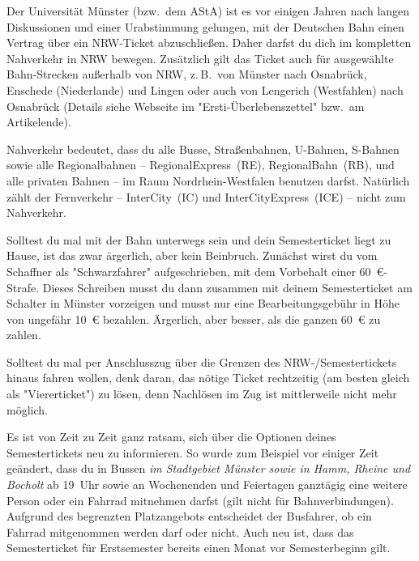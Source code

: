 \begin{multicols*}{2}
Der Universität Münster (bzw.\ dem AStA) ist es vor einigen Jahren nach langen Diskussionen und einer Urabstimmung gelungen, mit der Deutschen Bahn einen Vertrag über ein NRW-Ticket abzuschließen.
Daher darfst du dich im kompletten Nahverkehr in NRW bewegen.
Zusätzlich gilt das Ticket auch für ausgewählte Bahn-Strecken außerhalb von NRW, z.\,B.\ von Münster nach Osnabrück, Enschede (Niederlande) und Lingen oder auch von Lengerich (Westfahlen) nach Osnabrück (Details siehe Webseite im "Ersti-Überlebenszettel" bzw.\ am Artikelende).

Nahverkehr bedeutet, dass du alle Busse, Straßenbahnen, U-Bahnen, S-Bahnen sowie alle Regionalbahnen -- RegionalExpress~(RE), RegionalBahn~(RB), und alle privaten Bahnen -- im Raum Nordrhein-Westfalen benutzen darfst.
Natürlich zählt der Fernverkehr -- InterCity~(IC) und InterCityExpress~(ICE) -- nicht zum Nahverkehr.

Solltest du mal mit der Bahn unterwegs sein und dein Semesterticket liegt zu Hause, ist das zwar ärgerlich, aber kein Beinbruch.
Zunächst wirst du vom Schaffner als "Schwarzfahrer" aufgeschrieben, mit dem Vorbehalt einer \SI{60}{\euro}-Strafe.
Dieses Schreiben musst du dann zusammen mit deinem Semesterticket am Schalter in Münster vorzeigen und musst nur eine Bearbeitungsgebühr in Höhe von ungefähr \SI{10}{\euro} bezahlen.
Ärgerlich, aber besser, als die ganzen \SI{60}{\euro} zu zahlen.

Solltest du mal per Anschlusszug über die Grenzen des NRW-/Semestertickets hinaus fahren wollen, denk daran, das nötige Ticket rechtzeitig (am besten gleich als "Viererticket") zu lösen, denn Nachlösen im Zug ist mittlerweile nicht mehr möglich.

Es ist von Zeit zu Zeit ganz ratsam, sich über die Optionen deines Semestertickets neu zu informieren.
So wurde zum Beispiel vor einiger Zeit geändert, dass du in Bussen \emph{im Stadtgebiet Münster sowie in Hamm, Rheine und Bocholt} ab 19~Uhr sowie an Wochenenden und Feiertagen ganztägig eine weitere Person oder ein Fahrrad mitnehmen darfst (gilt nicht für Bahnverbindungen).
Aufgrund des begrenzten Platzangebots entscheidet der Busfahrer, ob ein Fahrrad mitgenommen werden darf oder nicht.
Auch neu ist, dass das Semesterticket für Erstsemester bereits einen Monat vor Semesterbeginn gilt.


\end{multicols*}
